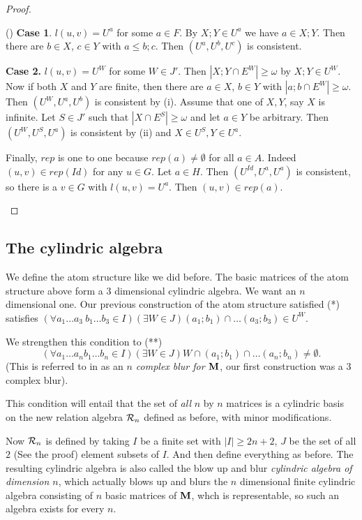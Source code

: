 \documentclass[12pt]{article}
\newcounter{kirshb}
\newenvironment{enumarab}{\setcounter{kirshb}{1}
\begin{list}{(\arabic{kirshb})}{\usecounter{kirshb}} }{\end{list}}
\theoremstyle{definition}
\begin{document}
\begin{proof}
\begin{enumarab}
{\bf Case 1}. $l(u,v)=U^a$ for some $a\in F$. By $X;Y\in U^a$ we have $a\in X;Y.$
Then there are $b\in X$, $c\in Y$ with $a\leq b;c.$ Then $(U^a, U^b, U^c)$ is consistent.

{\bf Case 2.}
$l(u,v)=U^W$ for some $W\in J'$. Then $|X;Y\cap E^W|\geq \omega$
by $X;Y\in U^W$.
Now if both $X$ and $Y$ are finite, then there are $a\in X$, $b\in Y$ with
$|a;b\cap E^W|\geq \omega$.
Then $(U^W, U^a, U^b)$ is consistent by (i). Assume that one of $X,Y$, say $X$ is infinite.
Let $S\in J'$ such that $|X\cap E^S|\geq \omega$ and let $a\in Y$ be arbitrary.
Then $(U^W, U^S, U^a)$ is consistent by (ii)
and $X\in U^S, Y\in U^a.$

Finally, $rep$ is one to one because $rep(a)\neq \emptyset$ for all $a\in A$.
Indeed $(u,v)\in rep(Id)$ for any
$u\in G$. Let $a\in H$. Then $(U^{Id}, U^a, U^a)$ is consistent, so there is a $v\in G$ with
$l(u,v)=U^a$. Then $(u,v)\in rep(a).$

\end{enumarab}

\end{proof}

\subsection{The cylindric algebra}


We define the atom structure like we did before. The basic matrices of the atom structure above form a
$3$ dimensional cylindric algebra. We want an
$n$ dimensional one.  Our previous construction of the atom structure satisfied (*)
satisfies $(\forall a_1\ldots a_3\ b_1\ldots b_3\in I)(\exists W\in J)(a_1;b_1)\cap\ldots (a_3;b_3)\in U^W.$

We strengthen this condition to (**)
$$(\forall a_1\ldots a_nb_1\ldots b_n\in I)(\exists W\in J)W\cap (a_1;b_1)\cap\ldots  (a_n;b_n)\neq \emptyset.$$
(This is referred to in \cite{Sayed} as an {\it $n$ complex blur for $\bold M$},
our first construction was a $3$ complex blur).

This condition will entail that the set of {\it all} $n$ by $n$ matrices is a cylindric basis on the new relation
algebra ${\cal R}_n$ defined as before, with minor modifications.

Now ${\cal R}_n$ is defined by taking $I$ be a finite set with $|I|\geq 2n+2$, $J$ be the set of all $2$ (See the proof) element
subsets of $I$. And then define everything as before.
The resulting cylindric algebra is also called the blow up and blur {\it cylindric algebra of dimension $n$},
which actually blows up  and blurs the $n$ dimensional finite cylindric algebra consisting of $n$ basic matrices of $\bold M$, whch is representable,
so such  an algebra exists for every $n.$
\end{document}
